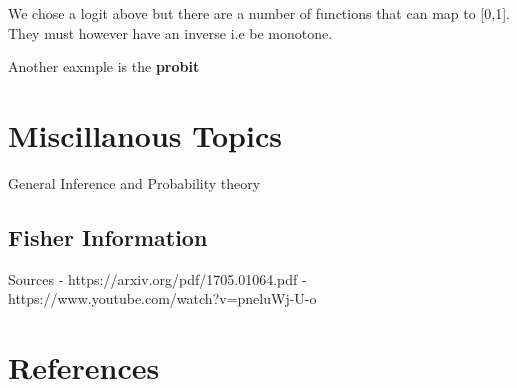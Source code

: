 \documentclass[
  letterpaper,
  DIV=11,
  numbers=noendperiod]{scrreprt}
\newlength{\cslhangindent}
\newlength{\cslentryspacingunit} %
\newenvironment{CSLReferences}[2] %
 {%
  \setlength{\parindent}{0pt}
  \ifodd #1
  \let\oldpar\par
  \def\par{\hangindent=\cslhangindent\oldpar}
  \fi
  \setlength{\parskip}{#2\cslentryspacingunit}
 }%
 {}
\begin{document}
We chose a logit above but there are a number of functions that can map
to {[}0,1{]}. They must however have an inverse i.e be monotone.

Another eaxmple is the \textbf{probit}


\hypertarget{miscillanous-topics}{%
\chapter{Miscillanous Topics}\label{miscillanous-topics}}

General Inference and Probability theory

\hypertarget{fisher-information}{%
\section{Fisher Information}\label{fisher-information}}

Sources - https://arxiv.org/pdf/1705.01064.pdf -
https://www.youtube.com/watch?v=pneluWj-U-o


\hypertarget{references}{%
\chapter*{References}\label{references}}


\hypertarget{refs}{}
\begin{CSLReferences}{0}{0}
\end{CSLReferences}
\end{document}
